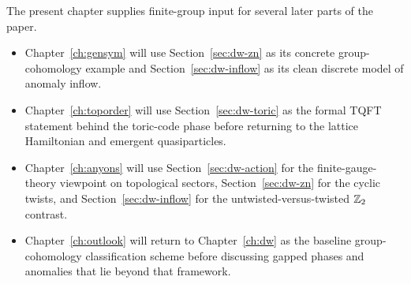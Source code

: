 \begin{remark}\label{rem:dw-downstream-map}
The present chapter supplies finite-group input for several later parts of the paper.
\begin{itemize}
\item Chapter~\ref{ch:gensym} will use Section~\ref{sec:dw-zn} as its concrete group-cohomology example and Section~\ref{sec:dw-inflow} as its clean discrete model of anomaly inflow.
\item Chapter~\ref{ch:toporder} will use Section~\ref{sec:dw-toric} as the formal TQFT statement behind the toric-code phase before returning to the lattice Hamiltonian and emergent quasiparticles.
\item Chapter~\ref{ch:anyons} will use Section~\ref{sec:dw-action} for the finite-gauge-theory viewpoint on topological sectors, Section~\ref{sec:dw-zn} for the cyclic twists, and Section~\ref{sec:dw-inflow} for the untwisted-versus-twisted $\mathbb{Z}_2$ contrast.
\item Chapter~\ref{ch:outlook} will return to Chapter~\ref{ch:dw} as the baseline group-cohomology classification scheme before discussing gapped phases and anomalies that lie beyond that framework.
\end{itemize}
\end{remark}
